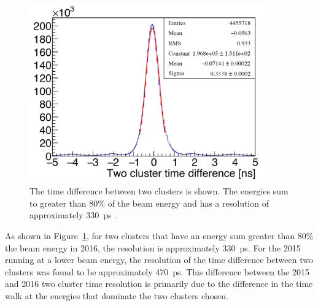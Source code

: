 \begin{figure}[H]
  \centering
      \includegraphics[width=0.9\textwidth]{pics/performance/2clusterTres.png}
  \caption[Time resolution for the time difference between two clusters]{The time difference between two clusters is shown. The energies sum to greater than 80$\%$ of the beam energy and has a resolution of approximately 330~ps .}
  \label{Figure:timeRes2cl}
\end{figure}

As shown in Figure~\ref{Figure:timeRes2cl}, for two clusters that have an energy sum greater than 80$\%$ the beam energy in 2016, the resolution is approximately 330~ps. For the 2015 running at a lower beam energy, the resolution of the time difference between two clusters was found to be approximately 470~ps. This difference between the 2015 and 2016 two cluster time resolution is primarily due to the difference in the time walk at the energies that dominate the two clusters chosen. 
